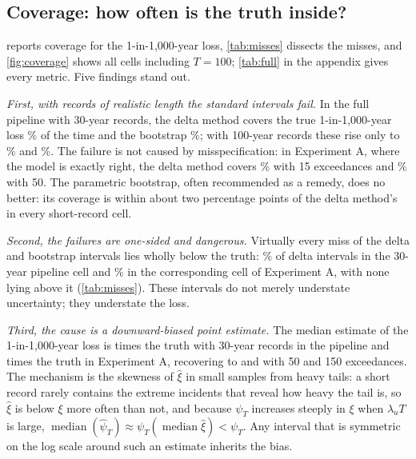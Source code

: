 \subsection{Coverage: how often is the truth inside?}\label{sec:coverage}

 reports coverage for the 1-in-1,000-year loss, \cref{tab:misses} dissects the misses, and \cref{fig:coverage} shows all cells including $T=100$; \cref{tab:full} in the appendix gives every metric. Five findings stand out.

\emph{First, with records of realistic length the standard intervals fail.} In the full pipeline with 30-year records, the delta method covers the true 1-in-1,000-year loss \covBThirtyDeltaK\% of the time and the bootstrap \covBThirtyBootstrapK\%; with 100-year records these rise only to \covBHundredDeltaK\% and \covBHundredBootstrapK\%. The failure is not caused by misspecification: in Experiment A, where the model is exactly right, the delta method covers \covAThirtyDeltaK\% with 15 exceedances and \covAHundredDeltaK\% with 50. The parametric bootstrap, often recommended as a remedy, does no better: its coverage is within about two percentage points of the delta method's in every short-record cell.

\emph{Second, the failures are one-sided and dangerous.} Virtually every miss of the delta and bootstrap intervals lies wholly below the truth: \belowBThirtyDeltaK\% of delta intervals in the 30-year pipeline cell and \belowAThirtyDeltaK\% in the corresponding cell of Experiment A, with none lying above it (\cref{tab:misses}). These intervals do not merely understate uncertainty; they understate the loss.

\emph{Third, the cause is a downward-biased point estimate.} The median estimate of the 1-in-1,000-year loss is \medRatioBThirtyK{} times the truth with 30-year records in the pipeline and \medRatioAThirtyK{} times the truth in Experiment A, recovering to \medRatioAHundredK{} and \medRatioAThreeHundredK{} with 50 and 150 exceedances. The mechanism is the skewness of $\hat\xi$ in small samples from heavy tails: a short record rarely contains the extreme incidents that reveal how heavy the tail is, so $\hat\xi$ is below $\xi$ more often than not, and because $\psi_T$ increases steeply in $\xi$ when $\lambda_u T$ is large, $\operatorname{median}(\hat\psi_T)\approx\psi_T(\operatorname{median}\hat\xi) < \psi_T$. Any interval that is symmetric on the log scale around such an estimate inherits the bias.

